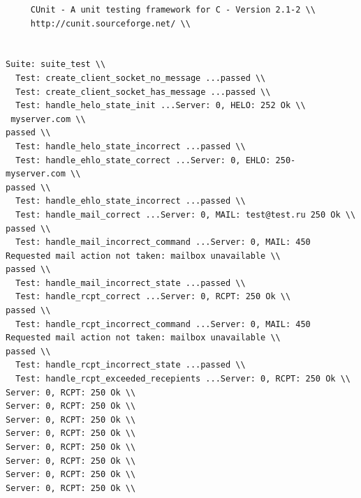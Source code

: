 \documentclass[a4paper,12pt]{report}
\begin{document}
\begin{verbatim}
     CUnit - A unit testing framework for C - Version 2.1-2 \\
     http://cunit.sourceforge.net/ \\


Suite: suite_test \\
  Test: create_client_socket_no_message ...passed \\
  Test: create_client_socket_has_message ...passed \\
  Test: handle_helo_state_init ...Server: 0, HELO: 252 Ok \\
 myserver.com \\
passed \\
  Test: handle_helo_state_incorrect ...passed \\
  Test: handle_ehlo_state_correct ...Server: 0, EHLO: 250- myserver.com \\
passed \\
  Test: handle_ehlo_state_incorrect ...passed \\
  Test: handle_mail_correct ...Server: 0, MAIL: test@test.ru 250 Ok \\
passed \\
  Test: handle_mail_incorrect_command ...Server: 0, MAIL: 450 Requested mail action not taken: mailbox unavailable \\
passed \\
  Test: handle_mail_incorrect_state ...passed \\
  Test: handle_rcpt_correct ...Server: 0, RCPT: 250 Ok \\
passed \\
  Test: handle_rcpt_incorrect_command ...Server: 0, MAIL: 450 Requested mail action not taken: mailbox unavailable \\
passed \\
  Test: handle_rcpt_incorrect_state ...passed \\
  Test: handle_rcpt_exceeded_recepients ...Server: 0, RCPT: 250 Ok \\
Server: 0, RCPT: 250 Ok \\
Server: 0, RCPT: 250 Ok \\
Server: 0, RCPT: 250 Ok \\
Server: 0, RCPT: 250 Ok \\
Server: 0, RCPT: 250 Ok \\
Server: 0, RCPT: 250 Ok \\
Server: 0, RCPT: 250 Ok \\
Server: 0, RCPT: 250 Ok \\

\end{verbatim}
\end{document}
